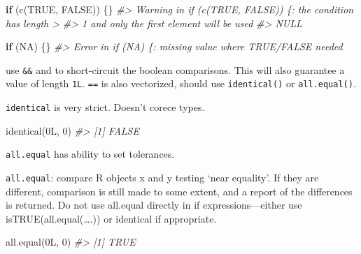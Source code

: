 \documentclass[
]{book}
\newenvironment{Shaded}{\begin{snugshade}}{\end{snugshade}}
\newcommand{\CommentTok}[1]{\textcolor[rgb]{0.56,0.35,0.01}{\textit{#1}}}
\newcommand{\ConstantTok}[1]{\textcolor[rgb]{0.00,0.00,0.00}{#1}}
\newcommand{\ControlFlowTok}[1]{\textcolor[rgb]{0.13,0.29,0.53}{\textbf{#1}}}
\newcommand{\DecValTok}[1]{\textcolor[rgb]{0.00,0.00,0.81}{#1}}
\newcommand{\FunctionTok}[1]{\textcolor[rgb]{0.00,0.00,0.00}{#1}}
\newcommand{\NormalTok}[1]{#1}
\begin{document}
\begin{Shaded}
\begin{Highlighting}[]
\ControlFlowTok{if}\NormalTok{ (}\FunctionTok{c}\NormalTok{(}\ConstantTok{TRUE}\NormalTok{, }\ConstantTok{FALSE}\NormalTok{)) \{\}}
\CommentTok{\#\textgreater{} Warning in if (c(TRUE, FALSE)) \{: the condition has length \textgreater{}}
\CommentTok{\#\textgreater{} 1 and only the first element will be used}
\CommentTok{\#\textgreater{} NULL}
\end{Highlighting}
\end{Shaded}

\begin{Shaded}
\begin{Highlighting}[]
\ControlFlowTok{if}\NormalTok{ (}\ConstantTok{NA}\NormalTok{) \{\}}
\CommentTok{\#\textgreater{} Error in if (NA) \{: missing value where TRUE/FALSE needed}
\end{Highlighting}
\end{Shaded}

use \texttt{\&\&} and \texttt{\textbar{}\textbar{}} to short-circuit the boolean comparisons.
This will also guarantee a value of length \texttt{1L}.
\texttt{==} is also vectorized, should use \texttt{identical()} or \texttt{all.equal()}.

\texttt{identical} is very strict. Doesn't corece types.

\begin{Shaded}
\begin{Highlighting}[]
\FunctionTok{identical}\NormalTok{(0L, }\DecValTok{0}\NormalTok{)}
\CommentTok{\#\textgreater{} [1] FALSE}
\end{Highlighting}
\end{Shaded}

\texttt{all.equal} has ability to set tolerances.

\texttt{all.equal}: compare R objects x and y testing `near equality'. If they are different, comparison is still made to some extent, and a report of the differences is returned. Do not use all.equal directly in if expressions---either use isTRUE(all.equal(\ldots.)) or identical if appropriate.

\begin{Shaded}
\begin{Highlighting}[]
\FunctionTok{all.equal}\NormalTok{(0L, }\DecValTok{0}\NormalTok{)}
\CommentTok{\#\textgreater{} [1] TRUE}
\end{Highlighting}
\end{Shaded}
\end{document}
